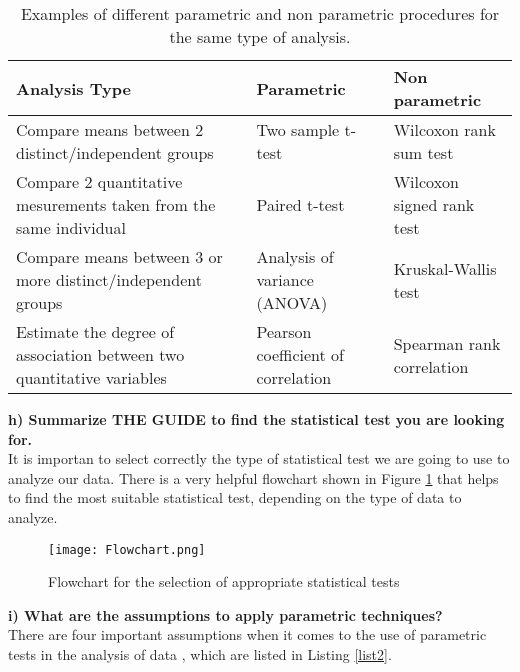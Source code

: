 \documentclass{article}
\begin{document}
\begin{table}[]\caption{Examples of different parametric and non parametric procedures for the same type of analysis.}\label{tab2}
\begin{tabular}{| p{6cm} | p{3.5cm} | p{3.5cm} | }
\hline
 \textbf{Analysis Type}&\textbf{Parametric} & \textbf{Non parametric}       \\              
\hline                                                                                                                                                 
Compare means between 2 distinct/independent groups& Two sample t-test&Wilcoxon rank sum test\\
\hline   
Compare 2 quantitative mesurements taken from the same individual&Paired t-test&Wilcoxon signed rank test\\
\hline
Compare means between 3 or more distinct/independent groups&Analysis of variance (ANOVA)&Kruskal-Wallis test\\
\hline
Estimate the degree of association between two quantitative variables& Pearson coefficient of correlation&Spearman rank correlation\\
\hline                                                 
\end{tabular}
\end{table}


\textbf{h) Summarize THE GUIDE to find the statistical test you are looking for.}\\

It is importan to select correctly the type of statistical test we are going to use to analyze our data. There is a very helpful flowchart \cite{not20} shown in Figure \ref{fig1} that helps to find the most suitable statistical test, depending on the type of data to analyze.\\
\begin{figure}[]
  \centering
  \texttt{[image: Flowchart.png]}  
  \caption{Flowchart for the selection of appropriate statistical tests}
  \label{fig1}
\end{figure}


\textbf{i) What are the assumptions to apply parametric techniques?}\\

There are four important assumptions when it comes to the use of parametric tests in the analysis of data \cite{verma2019}, which are listed in Listing \ref{list2}.
\end{document}
